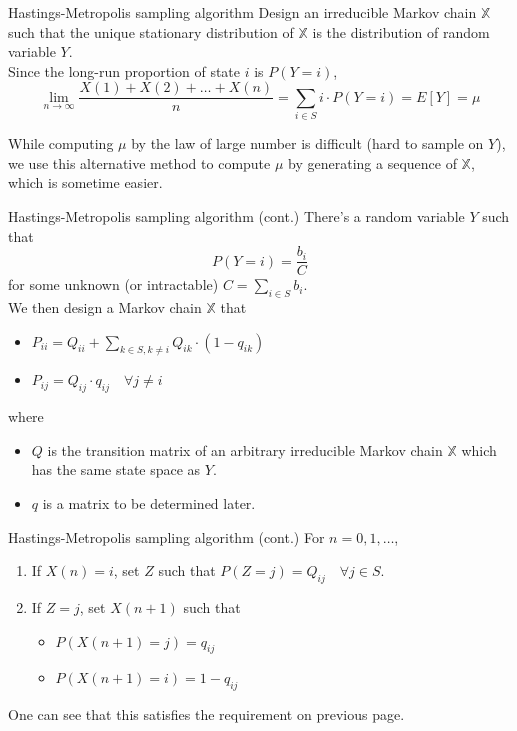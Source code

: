 \documentclass[mathserif]{beamer}
\begin{document}
\begin{frame}{Hastings-Metropolis sampling algorithm}
Design an irreducible Markov chain $\mathbb{X}$ such that the unique stationary distribution of $\mathbb{X}$ is the distribution of random variable $Y$.\\
Since the long-run proportion of state $i$ is $P(Y=i)$,
\[
\lim_{n\to\infty} \frac{X(1)+X(2)+\ldots+X(n)}{n} = \sum_{i\in S} i\cdot P(Y=i) = E[Y] = \mu
\]

While computing $\mu$ by the law of large number is difficult (hard to sample on $Y$), we use this alternative method to compute $\mu$ by generating a sequence of $\mathbb{X}$, which is sometime easier.
\end{frame}

\begin{frame}{Hastings-Metropolis sampling algorithm (cont.)}\label{possible_Y}
There's a random variable $Y$ such that
\[
P(Y=i) = \frac{b_i}{C}
\]
for some unknown (or intractable) $C = \sum_{i\in S}b_i$.\\
We then design a Markov chain $\mathbb{X}$ that
\begin{itemize}
\item $P_{ii} = Q_{ii} + \sum_{k\in S, k\neq i} Q_{ik}\cdot (1-q_{ik})$
\item $P_{ij} = Q_{ij}\cdot q_{ij} \quad\forall j\neq i$
\end{itemize}
where
\begin{itemize}
\item $Q$ is the transition matrix of an arbitrary irreducible Markov chain $\mathbb{X}$ which has the same state space as $Y$.
\item $q$ is a matrix to be determined later.
\end{itemize}
\end{frame}

\begin{frame}{Hastings-Metropolis sampling algorithm (cont.)}
For $n = 0,1,\ldots$,
\begin{enumerate}
\item If $X(n)=i$, set $Z$ such that $P(Z = j) = Q_{ij} \quad\forall j\in S$.
\item If $Z = j$, set $X(n+1)$ such that
	\begin{itemize}
	\item $P(X(n+1)=j) = q_{ij}$
	\item $P(X(n+1)=i) = 1 - q_{ij}$
	\end{itemize}
\end{enumerate}
One can see that this satisfies the requirement on previous page.
\end{frame}
\end{document}
